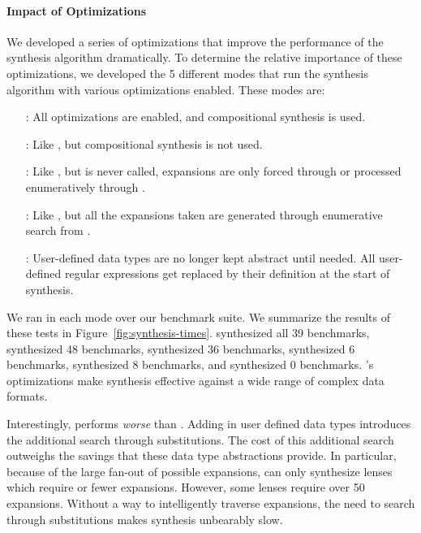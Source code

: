 \documentclass[sigplan,acmsmall]{acmart}
\begin{document}
\paragraph*{Impact of Optimizations}
We developed a series of optimizations that improve the performance of the
synthesis algorithm dramatically.  To determine the relative importance of these
optimizations, we developed the 5 different modes that run the synthesis
algorithm with various optimizations enabled.  These modes are:

\begin{itemize}
\item[\FullMode{}:] All optimizations are enabled, and compositional synthesis
  is used.
\item[\NoCSMode{}:] Like \FullMode{}, but compositional synthesis is not used.
\item[\NoFPEMode{}:] Like \NoCSMode{}, but \FixProblemElts{} is never called,
  expansions are only forced through \ExpandRequired{} or processed enumeratively
  through \ExpandOnce{}.
\item[\NoERMode{}:]  Like \NoFPEMode{}, but all the expansions taken are generated
  through enumerative search from \ExpandOnce{}.
\item[\NoUDMode{}:]  User-defined data types are no longer kept abstract until
  needed.  All user-defined regular expressions get replaced by their
  definition at the start of synthesis.
\end{itemize}

We ran \Optician{} in each mode over our benchmark suite.
We summarize the results of these tests in
Figure~\ref{fig:synthesis-times}.
\FullMode{} synthesized all 39 benchmarks, \NoCSMode{} synthesized 48
benchmarks, \NoFPEMode{} synthesized 36 benchmarks, \NoERMode{} synthesized 6
benchmarks, \NoUDMode{} synthesized 8 benchmarks, and \NaiveMode{} synthesized 0
benchmarks.  \Optician{}'s optimizations make
synthesis effective against a wide range of complex data formats.

Interestingly, \NoERMode{} performs \emph{worse} than \NoUDMode{}.
Adding in user defined data types introduces the additional search through
substitutions. 
The cost of this additional search outweighs the savings that these data type
abstractions provide.  In particular, because of the large fan-out of possible 
expansions, \NoERMode{} can only synthesize lenses which
require \ExpansionsPerformedNaiveExpansionSuccess{} or fewer expansions.  However, some lenses require over 50
expansions.  Without a way to intelligently traverse
expansions, the need to search through substitutions makes synthesis
unbearably slow.
\end{document}
